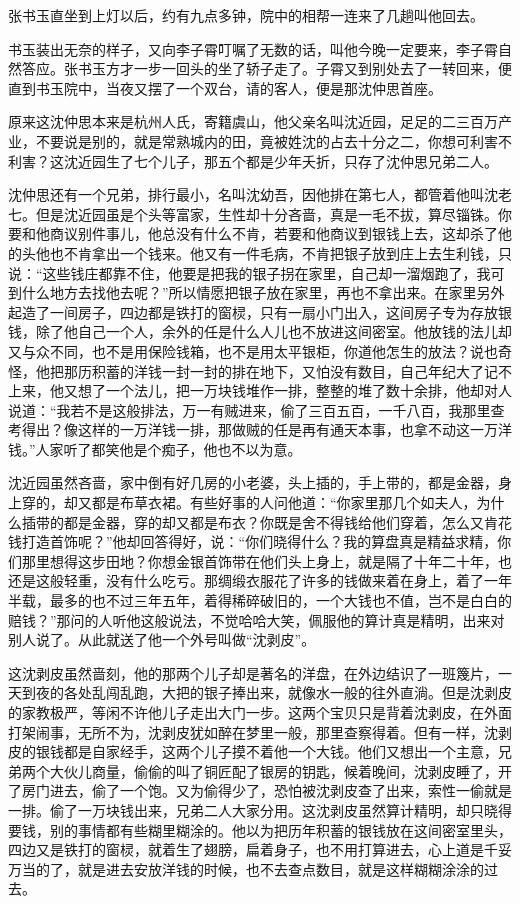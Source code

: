 \documentclass[12pt,UTF8]{ctexbook}
\begin{document}
{{{张书玉直坐到上灯以后，约有九点多钟，院中的相帮一连来了几趟叫他回去。

书玉装出无奈的样子，又向李子霄叮嘱了无数的话，叫他今晚一定要来，李子霄自然答应。张书玉方才一步一回头的坐了轿子走了。子霄又到别处去了一转回来，便直到书玉院中，当夜又摆了一个双台，请的客人，便是那沈仲思首座。

原来这沈仲思本来是杭州人氏，寄籍虞山，他父亲名叫沈近园，足足的二三百万产业，不要说是别的，就是常熟城内的田，竟被姓沈的占去十分之二，你想可利害不利害？这沈近园生了七个儿子，那五个都是少年夭折，只存了沈仲思兄弟二人。

沈仲思还有一个兄弟，排行最小，名叫沈幼吾，因他排在第七人，都管着他叫沈老七。但是沈近园虽是个头等富家，生性却十分吝啬，真是一毛不拔，算尽锱铢。你要和他商议别件事儿，他总没有什么不肯，若要和他商议到银钱上去，这却杀了他的头他也不肯拿出一个钱来。他又有一件毛病，不肯把银子放到庄上去生利钱，只说：“这些钱庄都靠不住，他要是把我的银子拐在家里，自己却一溜烟跑了，我可到什么地方去找他去呢？”所以情愿把银子放在家里，再也不拿出来。在家里另外起造了一间房子，四边都是铁打的窗棂，只有一扇小门出入，这间房子专为存放银钱，除了他自己一个人，余外的任是什么人儿也不放进这间密室。他放钱的法儿却又与众不同，也不是用保险钱箱，也不是用太平银柜，你道他怎生的放法？说也奇怪，他把那历积蓄的洋钱一封一封的排在地下，又怕没有数目，自己年纪大了记不上来，他又想了一个法儿，把一万块钱堆作一排，整整的堆了数十余排，他却对人说道：“我若不是这般排法，万一有贼进来，偷了三百五百，一千八百，我那里查考得出？像这样的一万洋钱一排，那做贼的任是再有通天本事，也拿不动这一万洋钱。”人家听了都笑他是个痴子，他也不以为意。

沈近园虽然吝啬，家中倒有好几房的小老婆，头上插的，手上带的，都是金器，身上穿的，却又都是布草衣裙。有些好事的人问他道：“你家里那几个如夫人，为什么插带的都是金器，穿的却又都是布衣？你既是舍不得钱给他们穿着，怎么又肯花钱打造首饰呢？”他却回答得好，说：“你们晓得什么？我的算盘真是精益求精，你们那里想得这步田地？你想金银首饰带在他们头上身上，就是隔了十年二十年，也还是这般轻重，没有什么吃亏。那绸缎衣服花了许多的钱做来着在身上，着了一年半载，最多的也不过三年五年，着得稀碎破旧的，一个大钱也不值，岂不是白白的赔钱？”那问的人听他这般说法，不觉哈哈大笑，佩服他的算计真是精明，出来对别人说了。从此就送了他一个外号叫做“沈剥皮”。

这沈剥皮虽然啬刻，他的那两个儿子却是著名的洋盘，在外边结识了一班篾片，一天到夜的各处乱闯乱跑，大把的银子捧出来，就像水一般的往外直淌。但是沈剥皮的家教极严，等闲不许他儿子走出大门一步。这两个宝贝只是背着沈剥皮，在外面打架闹事，无所不为，沈剥皮犹如醉在梦里一般，那里查察得着。但有一样，沈剥皮的银钱都是自家经手，这两个儿子摸不着他一个大钱。他们又想出一个主意，兄弟两个大伙儿商量，偷偷的叫了铜匠配了银房的钥匙，候着晚间，沈剥皮睡了，开了房门进去，偷了一个饱。又为偷得少了，恐怕被沈剥皮查了出来，索性一偷就是一排。偷了一万块钱出来，兄弟二人大家分用。这沈剥皮虽然算计精明，却只晓得要钱，别的事情都有些糊里糊涂的。他以为把历年积蓄的银钱放在这间密室里头，四边又是铁打的窗棂，就着生了翅膀，扁着身子，也不用打算进去，心上道是千妥万当的了，就是进去安放洋钱的时候，也不去查点数目，就是这样糊糊涂涂的过去。

}}}
\end{document}

